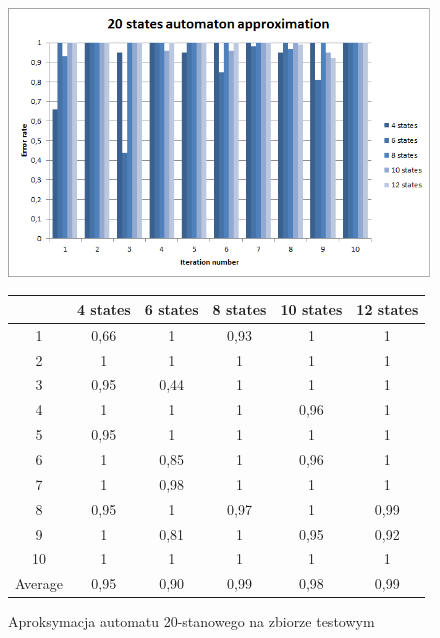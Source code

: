 \documentclass[runningheads,a4paper]{llncs}
\begin{document}
\begin{figure}[!htb]
\includegraphics[scale=0.92]{2.png}
\endminipage\hfill
\hspace{2.2cm}
\renewcommand{\arraystretch}{1.3}%
\begin{tabular}{@{}cccccc@{}}
\toprule
        & 4 states & 6 states & 8 states & 10 states & 12 states    \\ \midrule
1       & 0,66     & 1        & 0,93     & 1         & 1 \\
2       & 1        & 1        & 1        & 1         & 1 \\
3       & 0,95     & 0,44     & 1        & 1         & 1 \\
4       & 1        & 1        & 1        & 0,96      & 1   \\
5       & 0,95     & 1        & 1        & 1         & 1   \\
6       & 1        & 0,85     & 1        & 0,96      & 1    \\
7       & 1        & 0,98     & 1        & 1         & 1    \\
8       & 0,95     & 1        & 0,97     & 1         & 0,99     \\
9       & 1        & 0,81     & 1        & 0,95      & 0,92 \\
10      & 1        & 1        & 1        & 1         & 1  \\ \bottomrule
Average & 0,95    & 0,90    & 0,99     & 0,98     & 0,99  \\ \bottomrule
\end{tabular}
\vspace{4mm}
\endminipage\hfill
\caption{Aproksymacja automatu 20-stanowego na zbiorze testowym}
\end{figure}
\end{document}
